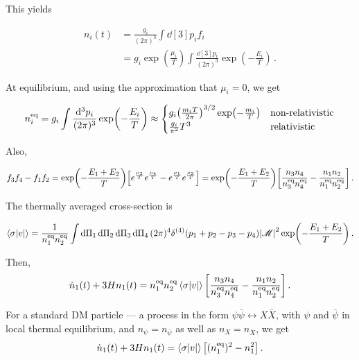 \begin{appendices}
This yields 

\begin{align}
    n_i (t) &= \frac{g_i}{(2 \pi )^3} \int \dd[3]{p_i} f_i  \\&= g_i \exp( \frac{\mu_i}{T}) \int \frac{ \dd[3]{p_i}}{(2 \pi )^3} \exp(- \frac{E_i}{T})\,.\label{eq: A.20}
\end{align}

At equilibrium, and using the approximation that \(\mu _i = 0\), we get

\begin{align} \label{eq:equilibrium-number-density}
    n^{\text{eq}}_i = g_i \int \frac{ \dd[3]{p_i}}{(2 \pi )^3} \exp(- \frac{E_i}{T}) \approx 
    \begin{cases} 
        g_i \qty(\frac{m_i T}{2 \pi })^{3/2} \exp(- \frac{m_i}{T}) & \text{non-relativistic}  \\   \frac{g_i}{\pi^2} T^3 & \text{relativistic} 
    \end{cases}
\end{align}

Also, 

\begin{align}
    f_3 f_4 - f_1 f_2 = \exp(- \frac{E_1 + E_2 }{T}) \qty[ e^{ \frac{\mu_3}{T}} e^{ \frac{\mu_4}{T}} - e^{\frac{\mu_1}{T}} e^{ \frac{\mu_2}{T}} ] = \exp(- \frac{E_1 + E_2 }{T}) \qty[\frac{n_3 n_4 }{n_3^{\text{eq}} n_4^{\text{eq}}} - \frac{n_1 n_2 }{n_1^{\text{eq}} n_2^{\text{eq}}}]
    \,. 
\end{align}

The thermally averaged cross-section is 

\begin{align}
    \expval{\sigma \abs{v}} = \frac{1}{n_1^{\text{eq}} n_2^{\text{eq}}}\int \dd{\Pi_1 }\dd{\Pi_2}\dd{\Pi_3 }\dd{\Pi_4 }(2 \pi )^{4} \delta^{(4)} (p_1 + p_2 - p_3 - p_4 )\abs{\mathcal{M}}^2 \exp(- \frac{E_1 + E_2 }{T})\,.
\end{align}

Then, 
%
\begin{align}
    \dot{n}_1(t) + 3 H n_1 (t) = n_1^{\text{eq}} n_2^{\text{eq}}  \expval{\sigma \abs{v}} \qty[  \frac{n_3 n_4 }{n_3^{\text{eq}} n_4^{\text{eq}}} -\frac{n_1 n_2 }{n_1^{\text{eq}} n_2^{\text{eq}}}]\,.\label{eq: A.24}
\end{align}

For a standard DM particle --- a process in the form \(\psi \overline{\psi} \leftrightarrow X \overline{X}\), with \(\psi \) and \(\overline{\psi }\) in local thermal equilibrium, and \(n_\psi = n_{\overline{\psi}}\) as well as \(n_X = n_{\overline{X}}\), we get 
%
\begin{align}
    \dot{n}_1 (t) + 3 H n_1 (t) = \expval{\sigma \abs{v}} \qty[ (n_1^{\text{eq}})^2 - n_1^2]\,.\label{eq: A.25}
\end{align}



\end{appendices}
